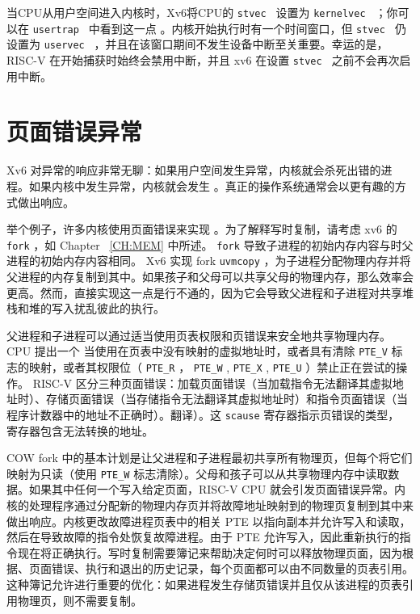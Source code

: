 当CPU从用户空间进入内核时，Xv6将CPU的 {    \tt    stvec   } 设置为 {    \tt    kernelvec   } ；你可以在  {    \tt    usertrap   }  中看到这一点
    。内核开始执行时有一个时间窗口，但  {    \tt    stvec   }  仍设置为  {    \tt    uservec   }  ，并且在该窗口期间不发生设备中断至关重要。幸运的是，RISC-V 在开始捕获时始终会禁用中断，并且 xv6 在设置  {    \tt    stvec   }  之前不会再次启用中断。  

   \section{页面错误异常  }   
    \label{sec:pagefaults}     

Xv6 对异常的响应非常无聊：如果用户空间发生异常，内核就会杀死出错的进程。如果内核中发生异常，内核就会发生 。真正的操作系统通常会以更有趣的方式做出响应。  

举个例子，许多内核使用页面错误来实现
        。为了解释写时复制，请考虑 xv6 的    \lstinline{fork}    ，如 Chapter~    \ref{CH:MEM}    中所述。
    \lstinline{fork}    导致子进程的初始内存内容与时父进程的初始内存内容相同。 Xv6 实现 fork
    \lstinline{uvmcopy}   
        ，为子进程分配物理内存并将父进程的内存复制到其中。如果孩子和父母可以共享父母的物理内存，那么效率会更高。然而，直接实现这一点是行不通的，因为它会导致父进程和子进程对共享堆栈和堆的写入扰乱彼此的执行。  

父进程和子进程可以通过适当使用页表权限和页错误来安全地共享物理内存。 CPU 提出一个
        当使用在页表中没有映射的虚拟地址时，或者具有清除    \lstinline{PTE_V}    标志的映射，或者其权限位（    \lstinline{PTE_R}    ，
    \lstinline{PTE_W}    ,
    \lstinline{PTE_X}    ,
    \lstinline{PTE_U}   ）禁止正在尝试的操作。 RISC-V 区分三种页面错误：加载页面错误（当加载指令无法翻译其虚拟地址时）、存储页面错误（当存储指令无法翻译其虚拟地址时）和指令页面错误（当程序计数器中的地址不正确时）。翻译）。这
    \lstinline{scause}    寄存器指示页错误的类型，       寄存器包含无法转换的地址。  

COW fork 中的基本计划是让父进程和子进程最初共享所有物理页，但每个将它们映射为只读（使用
    \lstinline{PTE_W}    标志清除）。父母和孩子可以从共享物理内存中读取数据。如果其中任何一个写入给定页面，RISC-V CPU 就会引发页面错误异常。内核的处理程序通过分配新的物理内存页并将故障地址映射到的物理页复制到其中来做出响应。内核更改故障进程页表中的相关 PTE 以指向副本并允许写入和读取，然后在导致故障的指令处恢复故障进程。由于 PTE 允许写入，因此重新执行的指令现在将正确执行。写时复制需要簿记来帮助决定何时可以释放物理页面，因为根据、页面错误、执行和退出的历史记录，每个页面都可以由不同数量的页表引用。这种簿记允许进行重要的优化：如果进程发生存储页错误并且仅从该进程的页表引用物理页，则不需要复制。  

